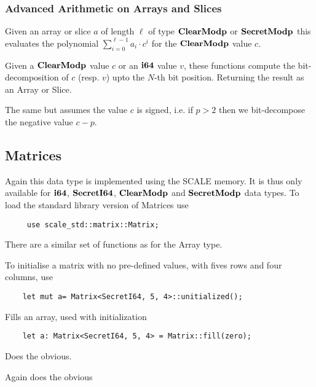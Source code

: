 \subsubsection{Advanced Arithmetic on Arrays and Slices}
Given an array or slice $a$ of length $\ell$ of type $\mathbf{ClearModp}$ or
$\mathbf{SecretModp}$ this evaluates the polynomial $\sum_{i=0}^{\ell-1} a_i \cdot c^i$
for the $\mathbf{ClearModp}$ value $c$.

Given a $\mathbf{ClearModp}$ value $c$ or an $\mathbf{i64}$ value $v$, these functions
compute the bit-decomposition of $c$ (resp. $v$) upto the $N$-th bit
position. Returning the result as an Array or Slice.

The same but assumes the value $c$ is signed, i.e. if $p>2$ then
we bit-decompose the negative value $c-p$.

\subsection{Matrices}
\label{sec:matrices}
Again this data type is implemented using the SCALE memory.
It is thus only available for $\mathbf{i64}$, $\mathbf{SecretI64}$, $\mathbf{ClearModp}$
and $\mathbf{SecretModp}$ data types.
To load the standard library version of Matrices use
\begin{lstlisting}
     use scale_std::matrix::Matrix;
\end{lstlisting}
There are a similar set of functions as for the Array type.

To initialise a matrix with no pre-defined values, with
fives rows and four columns, use
\begin{lstlisting}
    let mut a= Matrix<SecretI64, 5, 4>::unitialized();
\end{lstlisting}


Fills an array, used with initialization
\begin{lstlisting}
    let a: Matrix<SecretI64, 5, 4> = Matrix::fill(zero);
\end{lstlisting}


Does the obvious.

Again does the obvious

